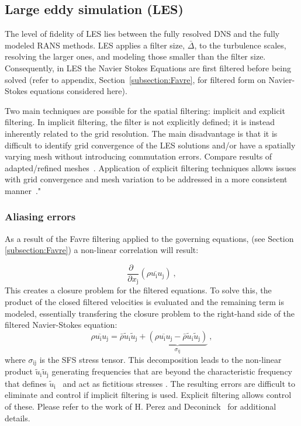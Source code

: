 \subsection{Large eddy simulation (LES)}
The level of fidelity of LES lies between the fully resolved DNS and the fully modeled RANS methods. LES applies a filter size, $\bar{\Delta}$, to the turbulence scales, resolving the larger ones, and modeling those smaller than the filter size. Consequently, in LES the Navier Stokes Equations are first
filtered before being solved (refer to appendix, Section~\ref{subsection:Favre}, for filtered form on Navier-Stokes equations considered here).\par

Two main techniques are possible for the spatial filtering: implicit and explicit filtering.  In implicit filtering, the filter is not explicitly defined; it is instead inherently related to the grid resolution.  The main disadvantage is that it is difficult to identify grid convergence of the LES solutions and/or have a spatially varying mesh without introducing commutation errors. Compare results of adapted/refined meshes~\cite{HPerez:2011, Deconinck:2008}.  Application of explicit filtering techniques allows issues with grid convergence and mesh variation to be addressed in a more consistent manner~\cite{HPerez:2011, Deconinck:2008}."

\subsubsection{Aliasing errors} \label{section:aliasing_errors}
As a result of the Favre filtering applied to the governing equations, (see Section \ref{subsection:Favre}) a non-linear correlation will result:\par
\begin{equation}
 \frac{\partial \;\;}{\partial x_\mathrm{j}} (\overline{\rho u_\mathrm{i} u_\mathrm{j}}) \: ,
 \end{equation}
This creates a closure problem for the filtered equations. To solve this, the product of the closed filtered velocities is evaluated and the remaining term is modeled, essentially transfering the closure problem to the right-hand side of the filtered Navier-Stokes equation:
\begin{equation}
\overline{\rho u_\mathrm{i} u_\mathrm{j}} = \bar{\rho} \tilde{u}_\mathrm{i} \tilde{u}_\mathrm{j} 
+\underbrace{ (\overline{\rho u_\mathrm{i} u_\mathrm{j}} - \bar{\rho} \tilde{u}_\mathrm{i} \tilde{u}_\mathrm{j} ) }_{\sigma_\mathrm{ij}} \: ,
\end{equation}
where $\sigma_\mathrm{ij}$ is the SFS stress tensor. This decomposition leads to the non-linear product $\tilde{u}_\mathrm{i} \tilde{u}_\mathrm{j}$ generating frequencies that are beyond the characteristic frequency that defines $\tilde{u}_\mathrm{i}$~ and act as fictitious stresses \cite{Lund:03}.
The resulting errors are difficult to eliminate and control if implicit filtering is used. Explicit filtering allows control of these. Please refer to the work of H. Perez \cite{HPerez:2011} and Deconinck~\cite{Deconinck:2008} for additional details.\par

